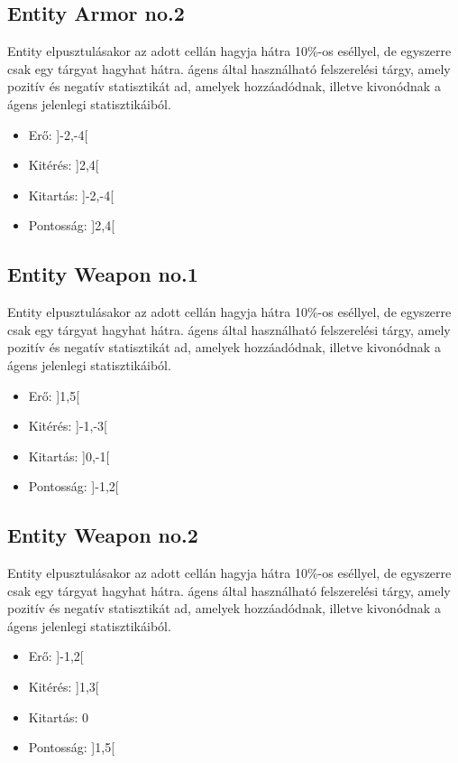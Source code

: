 \subsection{Entity Armor no.2}

Entity elpusztulásakor az adott cellán hagyja hátra 10\%-os eséllyel, de egyszerre csak egy tárgyat hagyhat hátra.
ágens által használható felszerelési tárgy, amely pozitív és negatív statisztikát ad, amelyek hozzáadódnak, illetve kivonódnak a ágens jelenlegi statisztikáiból.

\begin{itemize}
    \item Erő: ]-2,-4[
    \item Kitérés: ]2,4[
    \item Kitartás: ]-2,-4[
    \item Pontosság: ]2,4[
\end{itemize}

\subsection{Entity Weapon no.1}

Entity elpusztulásakor az adott cellán hagyja hátra 10\%-os eséllyel, de egyszerre csak egy tárgyat hagyhat hátra.
ágens által használható felszerelési tárgy, amely pozitív és negatív statisztikát ad, amelyek hozzáadódnak, illetve kivonódnak a ágens jelenlegi statisztikáiból.

\begin{itemize}
    \item Erő: ]1,5[
    \item Kitérés: ]-1,-3[
    \item Kitartás: ]0,-1[
    \item Pontosság: ]-1,2[
\end{itemize}

\subsection{Entity Weapon no.2}

Entity elpusztulásakor az adott cellán hagyja hátra 10\%-os eséllyel, de egyszerre csak egy tárgyat hagyhat hátra.
ágens által használható felszerelési tárgy, amely pozitív és negatív statisztikát ad, amelyek hozzáadódnak, illetve kivonódnak a ágens jelenlegi statisztikáiból.

\begin{itemize}
    \item Erő: ]-1,2[
    \item Kitérés: ]1,3[
    \item Kitartás: 0
    \item Pontosság: ]1,5[
\end{itemize}

